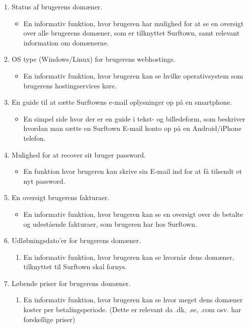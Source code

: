 \documentclass[12pt]{article}
\begin{document}
\begin{enumerate}
\begin{itemize}
	\end{itemize}
  \item{Status af brugerens domæner.}
	\begin{itemize}
		\item{En informativ funktion, hvor brugeren har mulighed for at se en oversigt over alle brugerens domæner, som er tilknyttet Surftown, samt relevant information om domænerne.}
	\end{itemize}
  \item{OS type (Windows/Linux) for brugerens webhostings.}
	\begin{itemize}
		\item{En informativ funktion, hvor brugeren kan se hvilke operativsystem som brugerens hostingservices køre.}
	\end{itemize}
  \item{En guide til at sætte Surftowns e-mail oplysninger op på en smartphone.}
	\begin{itemize}
		\item{En simpel side hvor der er en guide i tekst- og billedeform, som beskriver hvordan man sætte en Surftown E-mail konto op på en Android/iPhone telefon.}
	\end{itemize}
  \item{Mulighed for at recover sit bruger password.}
	\begin{itemize}
		\item{En funktion hvor brugeren kan skrive sin E-mail ind for at få tilsendt et nyt password.}
	\end{itemize}
  \item{En oversigt brugerens fakturaer.}
	\begin{itemize}
		\item{En informativ funktion, hvor brugeren kan se en oversigt over de betalte og udestående fakturaer, som brugeren har hos Surftown.}
	\end{itemize}
  \item{Udløbningsdato'er for brugerens domæner.}
	\begin{enumerate}
		\item{En informativ funktion, hvor brugeren kan se hvornår dens domæner, tilknyttet til Surftown skal fornys.}
	\end{enumerate}
  \item{Løbende priser for brugerens domæner.}
	\begin{enumerate}
		\item{En informativ funktion, hvor brugeren kan se hvor meget dens domæner koster per betalingsperiode. (Dette er relevant da .dk, .se, .com osv. har forskellige priser)}

\end{enumerate}
\end{enumerate}
\end{document}
